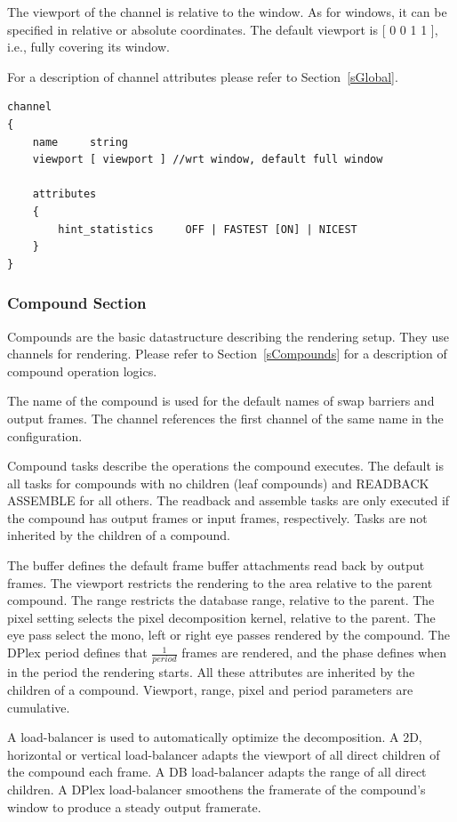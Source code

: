 \documentclass[10pt,a4]{scrartcl}
\newcommand{\sref}[1]{Section~\ref{#1}}
\begin{document}
The viewport of the channel is relative to the window. As for windows,
it can be specified in relative or absolute coordinates. The default
viewport is \textsf{[ 0 0 1 1 ]}, i.e., fully covering its window.

For a description of channel attributes please refer to \sref{sGlobal}.

{\footnotesize\begin{lstlisting}
channel
{
    name     string
    viewport [ viewport ] //wrt window, default full window

    attributes
    {
        hint_statistics     OFF | FASTEST [ON] | NICEST
    }
}
\end{lstlisting}}

\subsubsection{Compound Section}

Compounds are the basic datastructure describing the rendering
setup. They use channels for rendering. Please refer to
\sref{sCompounds} for a description of compound operation logics.

The name of the compound is used for the default names of swap barriers
and output frames. The channel references the first channel of the same
name in the configuration.

Compound tasks describe the operations the compound executes. The
default is all tasks for compounds with no children (leaf compounds) and
\textsf{READBACK ASSEMBLE} for all others. The readback and assemble
tasks are only executed if the compound has output frames or input
frames, respectively. Tasks are not inherited by the children of a
compound.

The buffer defines the default frame buffer attachments read back by
output frames. The viewport restricts the rendering to the area relative
to the parent compound. The range restricts the database range, relative
to the parent. The pixel setting selects the pixel decomposition kernel,
relative to the parent. The eye pass select the mono, left or right eye
passes rendered by the compound. The DPlex period defines that
$\frac{1}{period}$ frames are rendered, and the phase defines when in the period
the rendering starts. All these attributes are inherited by the children
of a compound. Viewport, range, pixel and period parameters are
cumulative.

A load-balancer is used to automatically optimize the decomposition. A
2D, horizontal or vertical load-balancer adapts the viewport of all
direct children of the compound each frame. A DB load-balancer adapts
the range of all direct children. A DPlex load-balancer smoothens the
framerate of the compound's window to produce a steady output framerate.
\end{document}
